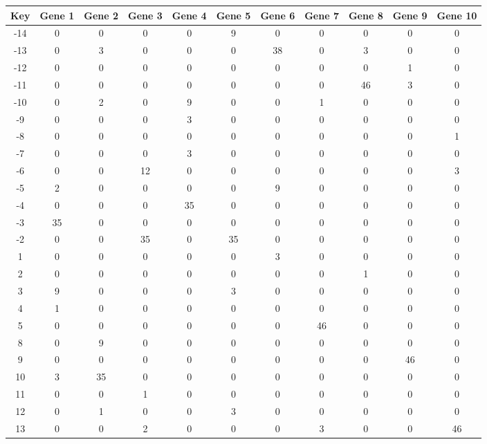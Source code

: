 \begin{tabular}{|c|c|c|c|c|c|c|c|c|c|c|}
\hline
Key & Gene 1 & Gene 2 & Gene 3 & Gene 4 & Gene 5 & Gene 6 & Gene 7 & Gene 8 & Gene 9 & Gene 10 \\
\hline
-14 & 0 & 0 & 0 & 0 & 9 & 0 & 0 & 0 & 0 & 0 \\
-13 & 0 & 3 & 0 & 0 & 0 & 38 & 0 & 3 & 0 & 0 \\
-12 & 0 & 0 & 0 & 0 & 0 & 0 & 0 & 0 & 1 & 0 \\
-11 & 0 & 0 & 0 & 0 & 0 & 0 & 0 & 46 & 3 & 0 \\
-10 & 0 & 2 & 0 & 9 & 0 & 0 & 1 & 0 & 0 & 0 \\
-9 & 0 & 0 & 0 & 3 & 0 & 0 & 0 & 0 & 0 & 0 \\
-8 & 0 & 0 & 0 & 0 & 0 & 0 & 0 & 0 & 0 & 1 \\
-7 & 0 & 0 & 0 & 3 & 0 & 0 & 0 & 0 & 0 & 0 \\
-6 & 0 & 0 & 12 & 0 & 0 & 0 & 0 & 0 & 0 & 3 \\
-5 & 2 & 0 & 0 & 0 & 0 & 9 & 0 & 0 & 0 & 0 \\
-4 & 0 & 0 & 0 & 35 & 0 & 0 & 0 & 0 & 0 & 0 \\
-3 & 35 & 0 & 0 & 0 & 0 & 0 & 0 & 0 & 0 & 0 \\
-2 & 0 & 0 & 35 & 0 & 35 & 0 & 0 & 0 & 0 & 0 \\
1 & 0 & 0 & 0 & 0 & 0 & 3 & 0 & 0 & 0 & 0 \\
2 & 0 & 0 & 0 & 0 & 0 & 0 & 0 & 1 & 0 & 0 \\
3 & 9 & 0 & 0 & 0 & 3 & 0 & 0 & 0 & 0 & 0 \\
4 & 1 & 0 & 0 & 0 & 0 & 0 & 0 & 0 & 0 & 0 \\
5 & 0 & 0 & 0 & 0 & 0 & 0 & 46 & 0 & 0 & 0 \\
8 & 0 & 9 & 0 & 0 & 0 & 0 & 0 & 0 & 0 & 0 \\
9 & 0 & 0 & 0 & 0 & 0 & 0 & 0 & 0 & 46 & 0 \\
10 & 3 & 35 & 0 & 0 & 0 & 0 & 0 & 0 & 0 & 0 \\
11 & 0 & 0 & 1 & 0 & 0 & 0 & 0 & 0 & 0 & 0 \\
12 & 0 & 1 & 0 & 0 & 3 & 0 & 0 & 0 & 0 & 0 \\
13 & 0 & 0 & 2 & 0 & 0 & 0 & 3 & 0 & 0 & 46 \\
\hline
\end{tabular}